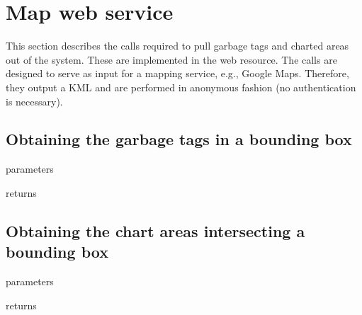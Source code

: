 \section{Map web service}
\label{sec:call:map}

This section describes the calls required to pull garbage tags and charted areas
out of the system. These are implemented in the
 web resource. The
calls are designed to serve as input for a mapping service, e.g., Google Maps.
Therefore, they output a KML and are performed in anonymous fashion (no
authentication is necessary).

\subsection{Obtaining the garbage tags in a bounding box}

\begin{apidata}{parameters}
  \begin{datalist}
  \end{datalist}
\end{apidata}
\begin{apidata}{returns}
  \begin{datalist}
  \end{datalist}
\end{apidata}

\subsection{Obtaining the chart areas intersecting a bounding box}

\begin{apidata}{parameters}
  \begin{datalist}
  \end{datalist}
\end{apidata}
\begin{apidata}{returns}
  \begin{datalist}
  \end{datalist}
\end{apidata}

